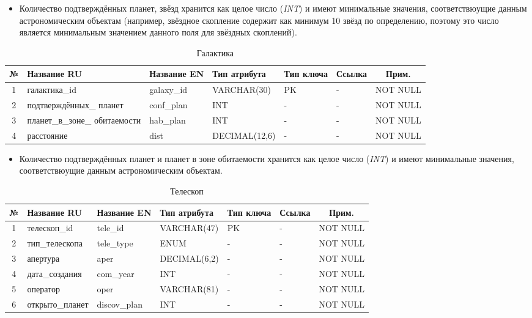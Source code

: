 \documentclass[14pt,a4paper]{extarticle}
\begin{document}
	\begin{itemize}
		\item Количество подтверждённых планет, звёзд хранится как целое число (\textit{INT}) и имеют минимальные значения, соответствюущие данным астрономическим объектам (например, звёздное скопление содержит как минимум 10 звёзд по определению, поэтому это число является минимальным значением данного поля для звёздных скоплений).
	\end{itemize}

	\begin{table}[H]
    \centering
    \caption{Галактика}
    \small
\begin{tabular}{|c|p{3.2cm}|p{2.6cm}|p{2.8cm}|p{1.5cm}|p{1.5cm}|c|}
\hline
№ & Название RU & Название EN & Тип атрибута & Тип ключа & Ссылка & Прим. \\
\hline
1 & галактика\_id & galaxy\_id & VARCHAR(30) & PK & - & NOT NULL \\
2 & подтверждённых\_ планет & conf\_plan & INT & - & - & NOT NULL \\
3 & планет\_в\_зоне\_ обитаемости & hab\_plan & INT & - & - & NOT NULL \\
4 & расстояние & dist & DECIMAL(12,6) & - & - & NOT NULL \\
\hline
\end{tabular}
\end{table}

	\begin{itemize}
		\item Количество подтверждённых планет и планет в зоне обитаемости хранится как целое число (\textit{INT}) и имеют минимальные значения, соответствюущие данным астрономическим объектам.
	\end{itemize}

	\begin{table}[H]
    \centering
    \caption{Телескоп}
    \small
\begin{tabular}{|c|p{3.2cm}|p{2.6cm}|p{2.8cm}|p{1.5cm}|p{1.5cm}|c|}
\hline
№ & Название RU & Название EN & Тип атрибута & Тип ключа & Ссылка & Прим. \\
\hline
1 & телескоп\_id & tele\_id & VARCHAR(47) & PK & - & NOT NULL \\
2 & тип\_телескопа & tele\_type & ENUM & - & - & NOT NULL \\
3 & апертура & aper & DECIMAL(6,2) & - & - & NOT NULL \\
4 & дата\_создания & com\_year & INT & - & - & NOT NULL \\
5 & оператор & oper & VARCHAR(81) & - & - & NOT NULL \\
6 & открыто\_планет & discov\_plan & INT & - & - & NOT NULL \\
\hline
\end{tabular}
\end{table}
\end{document}
